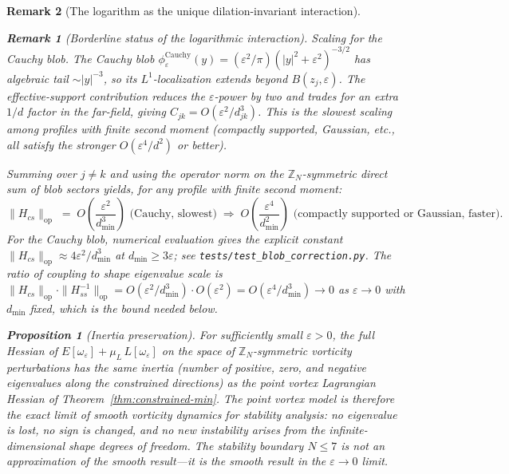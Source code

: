 \documentclass[12pt, a4paper]{article}
\newtheorem{proposition}[theorem]{Proposition}
\newtheorem{remark}{Remark}[section]
\numberwithin{equation}{section}
\begin{document}
\begin{remark}[The logarithm as the unique dilation-invariant interaction]
\begin{remark}[Borderline status of the logarithmic interaction]
\emph{Scaling for the Cauchy blob.}
The Cauchy blob
$\phi^{\mathrm{Cauchy}}_\varepsilon(y)
= (\varepsilon^2/\pi)(|y|^2 + \varepsilon^2)^{-3/2}$ has algebraic
tail $\sim|y|^{-3}$, so its $L^1$-localization extends beyond
$B(z_j, \varepsilon)$.  The effective-support contribution
reduces the $\varepsilon$-power by two and trades for an extra
$1/d$ factor in the far-field, giving
$C_{jk} = O(\varepsilon^2/d_{jk}^3)$.  This is the \emph{slowest}
scaling among profiles with finite second moment (compactly
supported, Gaussian, etc., all satisfy the stronger
$O(\varepsilon^4/d^2)$ or better).

Summing over $j \ne k$ and using the operator norm on the
$\mathbb{Z}_N$-symmetric direct sum of blob sectors yields, for
any profile with finite second moment:
\begin{equation}\label{eq:coupling-op-norm}
  \|H_{cs}\|_{\mathrm{op}}
  \;=\; O\!\left(\frac{\varepsilon^2}{d_{\min}^3}\right)
  \text{ (Cauchy, slowest)}
  \;\Longrightarrow\;
  O\!\left(\frac{\varepsilon^4}{d_{\min}^2}\right)
  \text{ (compactly supported or Gaussian, faster)}.
\end{equation}
For the Cauchy blob, numerical evaluation gives the explicit
constant $\|H_{cs}\|_{\mathrm{op}} \approx 4\varepsilon^2/d_{\min}^3$
at $d_{\min} \ge 3\varepsilon$; see
\texttt{tests/test\_blob\_correction.py}.
The ratio of coupling to shape eigenvalue scale is
$\|H_{cs}\|_{\mathrm{op}}\cdot\|H_{ss}^{-1}\|_{\mathrm{op}}
= O(\varepsilon^2/d_{\min}^3)\cdot O(\varepsilon^2)
= O(\varepsilon^4/d_{\min}^3) \to 0$
as $\varepsilon\to 0$ with $d_{\min}$ fixed, which is the
bound needed below.

\begin{proposition}[Inertia preservation]
\label{prop:inertia}
For sufficiently small $\varepsilon > 0$, the full Hessian of
$E[\omega_\varepsilon] + \mu_L\,L[\omega_\varepsilon]$ on the space of
$\mathbb{Z}_N$-symmetric vorticity perturbations has the same inertia
(number of positive, zero, and negative eigenvalues along the constrained
directions) as the point vortex Lagrangian Hessian of
Theorem~\ref{thm:constrained-min}.  The point vortex model is therefore
the \emph{exact} limit of smooth vorticity dynamics for stability
analysis: no eigenvalue is lost, no sign is changed, and no new
instability arises from the infinite-dimensional shape degrees of
freedom.  The stability boundary $N \le 7$ is not an approximation of
the smooth result---it \emph{is} the smooth result in the
$\varepsilon \to 0$ limit.
\end{proposition}


\end{remark}
\end{remark}
\end{document}
